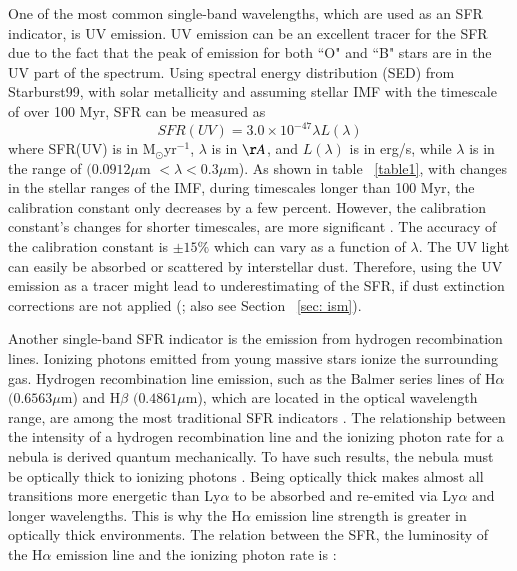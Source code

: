 One of the most common single-band wavelengths, which are used as an SFR indicator, is UV emission. UV emission can be an excellent tracer for the SFR due to the fact that the peak of emission for both ``O" and ``B" stars are in the UV part of the spectrum. Using spectral energy distribution (SED) from Starburst99, with solar metallicity and assuming \cite{Kroupa01} stellar IMF with the timescale of over 100 Myr, SFR can be measured as \citep{Leitherer99}
\begin{equation}
SFR(UV) = 3.0 \times 10^{-47}\lambda L(\lambda)
\end{equation}
where SFR(UV) is in M$_{\odot}$yr$^{-1}$, $\lambda$ is in $\AA$, and $L(\lambda)$ is in erg/s, while $\lambda$ is in the range of $(0.0912\mu$m $< \lambda < 0.3\mu$m). As shown in table ~\ref{table1}, with changes in the stellar ranges of the IMF, during timescales longer than 100 Myr, the calibration constant only decreases by a few percent. However, the calibration constant's changes for shorter timescales, are more significant \citep{Calzetti13}. The accuracy of the calibration constant is $\pm 15\%$ which can vary as a function of $\lambda$. The UV light can easily be absorbed or scattered by interstellar dust. Therefore, using the UV emission as a tracer might lead to underestimating of the SFR, if dust extinction corrections are not applied (\cite{Kennicutt12}; also see Section ~\ref{sec: ism}). 

Another single-band SFR indicator is the emission from hydrogen recombination lines. Ionizing photons emitted from young massive stars ionize the surrounding gas. Hydrogen recombination line emission, such as the Balmer series lines of H${\alpha}$ $(0.6563 \mu$m) and H${\beta}$ $(0.4861 \mu$m), which are located in the optical wavelength range, are among the most traditional SFR indicators \citep{Kennicutt98a}.  The relationship between the intensity of a hydrogen recombination line and the ionizing photon rate for a nebula is derived quantum mechanically. To have such results, the nebula must be optically thick to ionizing photons \citep{Osterbrock06}. Being optically thick makes almost all transitions more energetic than Ly${\alpha}$ to be absorbed and re-emited via Ly${\alpha}$ and longer wavelengths. This is why the H${\alpha}$ emission line strength is greater in optically thick environments. The relation between the SFR, the luminosity of the H$\alpha$ emission line and the ionizing photon rate is \citep[e.g.,][]{Osterbrock06, Kennicutt98b}:

